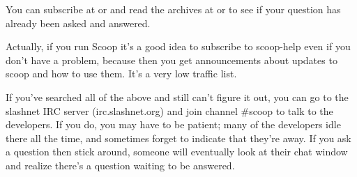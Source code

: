 You can subscribe at  or  and read the archives at  or  to see if your question has already been asked and answered.

Actually, if you run Scoop it's a good idea to subscribe to scoop-help even if you don't have a problem, because then you get announcements about updates to scoop and how to use them.  It's a very low traffic list.

If you've searched all of the above and still can't figure it out, you can go to the slashnet IRC server (irc.slashnet.org) and join channel \#scoop to talk to the developers.  If you do, you may have to be patient; many of the developers idle there all the time, and sometimes forget to indicate that they're away.  If you ask a question then stick around, someone will eventually look at their chat window and realize there's a question waiting to be answered.

